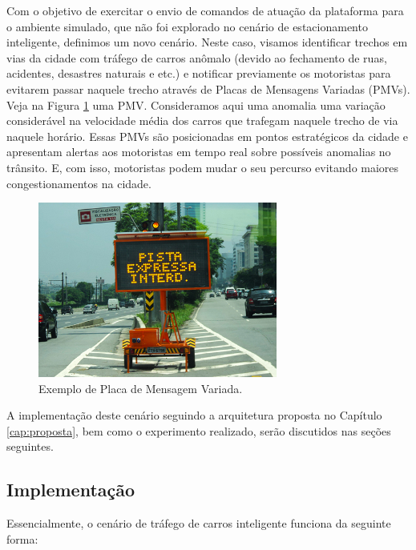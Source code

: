 Com o objetivo de exercitar o envio de comandos de atuação da plataforma para o ambiente simulado, que não foi explorado no cenário de estacionamento inteligente, definimos um novo cenário.
Neste caso, visamos identificar trechos em vias da cidade com tráfego de carros anômalo (devido ao fechamento de ruas, acidentes, desastres naturais e etc.) e notificar
previamente os motoristas para evitarem passar naquele trecho através de Placas de Mensagens Variadas (PMVs).
Veja na Figura \ref{fig:pmv} uma PMV.
Consideramos aqui uma anomalia uma variação considerável na velocidade média dos carros que trafegam naquele trecho de via naquele horário.
Essas PMVs são posicionadas em pontos estratégicos da cidade e apresentam alertas aos motoristas em tempo real sobre possíveis anomalias no trânsito.
E, com isso, motoristas podem mudar o seu percurso evitando maiores congestionamentos na cidade.

\begin{figure}[ht]
	\centering
	\includegraphics[width=0.7\textwidth]{figuras/pmv.jpg}
    \caption{Exemplo de Placa de Mensagem Variada.}
	\label{fig:pmv}
\end{figure}


A implementação deste cenário seguindo a arquitetura proposta no Capítulo \ref{cap:proposta}, bem como o experimento realizado, serão discutidos nas seções seguintes.

\subsection{Implementação}
\label{sec:smart_traffic}

Essencialmente, o cenário de tráfego de carros inteligente funciona da seguinte forma:

